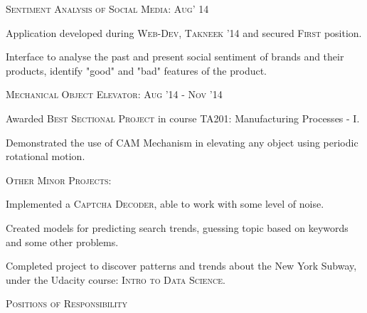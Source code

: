 \documentclass[10pt]{article}
\begin{document}
	\vspace{1mm}
	
	\large{\textsc{Sentiment Analysis of Social Media:}}   \hfill \small\textsc{Aug' 14}
	\begin{itemize}
	\small
	{
	\item Application developed during \textsc{Web-Dev, Takneek '14} and secured \textsc{First} position.
	\item Interface to analyse the past and present social sentiment of brands and their products, identify "good" and "bad" features of the product.
	}
	\end{itemize}
 		
	\vspace{1mm}
	
	\large{\textsc{Mechanical Object Elevator:}}   \hfill \small\textsc{Aug '14 - Nov '14}
	\begin{itemize}
	\small
	{
	\item Awarded \textsc{Best Sectional Project} in course TA201: Manufacturing Processes - I.
	\item Demonstrated the use of \textsc{CAM} Mechanism in elevating any object using periodic rotational motion.
	}
	\end{itemize}
 	
	\vspace{1mm}
	
	\large{\textsc{Other Minor Projects:}}
	\begin{itemize}
	\small
	{
	\item Implemented a \textsc{Captcha Decoder}, able to work with some level of noise.
	\item Created models for predicting search trends, guessing topic based on keywords and some other problems.
	\item Completed project to discover patterns and trends about the New York Subway, under the Udacity course: \textsc{Intro to Data Science}.
	}
	\end{itemize}
 	
	\vspace{4mm}
	
	{\centering\Large{\textsc{Positions of Responsibility}}	\hrulefill}
		
	\vspace{4mm}		
\end{document}
